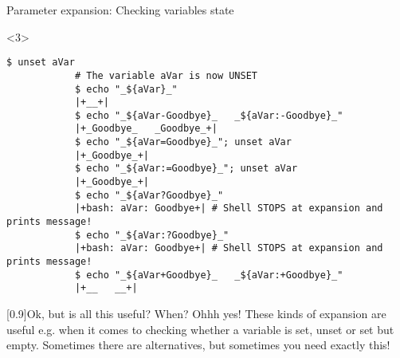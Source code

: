 \begin{frame}[fragile]{Parameter expansion: Checking variables state}
    \begin{onlyenv}<3>
        \begin{lstlisting}[style=MyBash, style=oddnumbers, style=smaller, firstnumber=26]
            $ unset aVar
            # The variable aVar is now UNSET
            $ echo "_${aVar}_"
            |+__+|
            $ echo "_${aVar-Goodbye}_   _${aVar:-Goodbye}_"
            |+_Goodbye_   _Goodbye_+|
            $ echo "_${aVar=Goodbye}_"; unset aVar
            |+_Goodbye_+|
            $ echo "_${aVar:=Goodbye}_"; unset aVar
            |+_Goodbye_+|
            $ echo "_${aVar?Goodbye}_"
            |+bash: aVar: Goodbye+| # Shell STOPS at expansion and prints message!
            $ echo "_${aVar:?Goodbye}_"
            |+bash: aVar: Goodbye+| # Shell STOPS at expansion and prints message!
            $ echo "_${aVar+Goodbye}_   _${aVar:+Goodbye}_"
            |+__   __+|
        \end{lstlisting}
        \begin{varblock}{}[0.9\textwidth]{Ok, but is all this useful? When?}
            Ohhh yes! These kinds of expansion are useful e.g. when it comes to checking whether a variable is set, unset or set but empty.
            Sometimes there are alternatives, but sometimes you need exactly this!
        \end{varblock}
    \end{onlyenv}
\end{frame}
